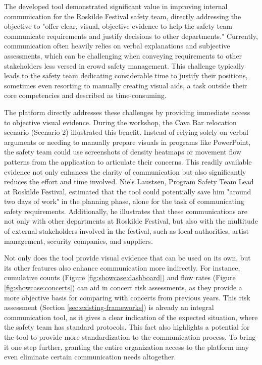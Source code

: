 The developed tool demonstrated significant value in improving internal communication for the Roskilde Festival safety team, directly addressing the objective to "offer clear, visual, objective evidence to help the safety team communicate requirements and justify decisions to other departments." Currently, communication often heavily relies on verbal explanations and subjective assessments, which can be challenging when conveying requirements to other stakeholders less versed in crowd safety management. This challenge typically leads to the safety team dedicating considerable time to justify their positions, sometimes even resorting to manually creating visual aids, a task outside their core competencies and described as time-consuming.

The platform directly addresses these challenges by providing immediate access to objective visual evidence. During the workshop, the Cava Bar relocation scenario (Scenario 2) illustrated this benefit. Instead of relying solely on verbal arguments or needing to manually prepare visuals in programs like PowerPoint, the safety team could use screenshots of density heatmaps or movement flow patterns from the application to articulate their concerns. This readily available evidence not only enhances the clarity of communication but also significantly reduces the effort and time involved. Niels Laustsen, Program Safety Team Lead at Roskilde Festival, estimated that the tool could potentially save him "around two days of work" in the planning phase, alone for the task of communicating safety requirements. Additionally, he illustrates that these communications are not only with other departments at Roskilde Festival, but also with the multitude of external stakeholders involved in the festival, such as local authorities, artist management, security companies, and suppliers.

Not only does the tool provide visual evidence that can be used on its own, but its other features also enhance communication more indirectly. For instance, cumulative counts (Figure \ref{fig:showcase:dashboard}) and flow rates (Figure \ref{fig:showcase:concerts}) can aid in concert risk assessments, as they provide a more objective basis for comparing with concerts from previous years. This risk assessment (Section \ref{sec:existing-frameworks}) is already an integral communication tool, as it gives a clear indication of the expected situation, where the safety team has standard protocols. This fact also highlights a potential for the tool to provide more standardization to the communication process. To bring it one step further, granting the entire organization access to the platform may even eliminate certain communication needs altogether.

